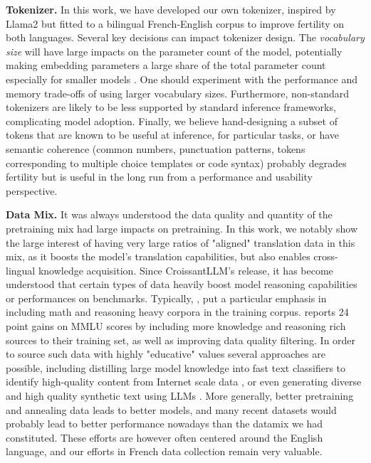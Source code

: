 \noindent\textbf{Tokenizer.}
In this work, we have developed our own tokenizer, inspired by Llama2  but fitted to a bilingual French-English corpus to improve fertility on both languages. Several key decisions can impact tokenizer design. The \textit{vocabulary size} will have large impacts on the parameter count of the model, potentially making embedding parameters a large share of the total parameter count especially for smaller models . One should experiment with the performance and memory trade-offs of using larger vocabulary sizes. Furthermore, non-standard tokenizers are likely to be less supported by standard inference frameworks, complicating model adoption. Finally, we believe hand-designing a subset of tokens that are known to be useful at inference, for particular tasks, or have semantic coherence (common numbers, punctuation patterns, tokens corresponding to multiple choice templates or code syntax) probably degrades fertility but is useful in the long run from a performance and usability perspective.


\noindent\textbf{Data Mix.} It was always understood the data quality and quantity of the pretraining mix had large impacts on pretraining. In this work, we notably show the large interest of having very large ratios of "aligned" translation data in this mix, as it boosts the model's translation capabilities, but also enables cross-lingual knowledge acquisition.
Since CroissantLLM's release, it has become understood that certain types of data heavily boost model reasoning capabilities or performances on benchmarks.
Typically, ,  put a particular emphasis in including math and reasoning heavy corpora in the training corpus.  reports 24 point gains on MMLU scores by including more knowledge and reasoning rich sources to their training set, as well as improving data quality filtering. In order to source such data with highly "educative" values several approaches are possible, including distilling large model knowledge into fast text classifiers to identify high-quality content from Internet scale data , or even generating diverse and high quality synthetic text using LLMs . More generally, better pretraining and annealing data leads to better models, and many recent datasets would probably lead to better performance nowadays than the datamix we had constituted. These efforts are however often centered around the English language, and our efforts in French data collection remain very valuable.

